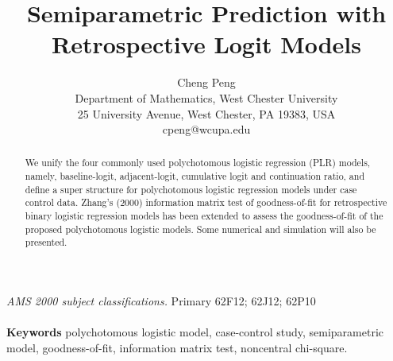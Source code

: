 \documentclass[11pt]{article}
\title{ \bf Semiparametric Prediction with Retrospective Logit Models}
\author{Cheng Peng \\
 { \small{Department of Mathematics,}}\vspace{-2mm}
{\small West Chester University}\\\vspace{-2mm}
\small 25 University Avenue,  West Chester, PA 19383, USA \\
cpeng@wcupa.edu}
\theoremstyle{plain}
\theoremstyle{definition}
\theoremstyle{remark}
\theoremstyle{definition}
\begin{document}
\maketitle

\begin{abstract}
We unify the four commonly used polychotomous logistic regression (PLR) models, namely,
baseline-logit, adjacent-logit, cumulative logit and continuation ratio,
and define a super structure for polychotomous logistic regression models
under case control data. Zhang's (2000) information matrix test of goodness-of-fit
for retrospective binary logistic regression models has been extended
to assess the goodness-of-fit of the proposed polychotomous logistic models.
Some numerical and simulation will also be presented.\\
\end{abstract}
{\em AMS 2000 subject classifications.} Primary 62F12; 62J12; 62P10
\\
\\
\textbf{Keywords} {polychotomous logistic model, case-control study,
semiparametric model, goodness-of-fit, information matrix test, noncentral chi-square.  }


\end{document}
